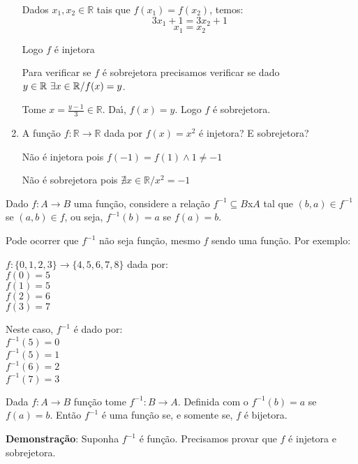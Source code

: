 \begin{exemplos}
\begin{enumerate}
		Dados $x_{1}, x_{2}\in\mathbb{R}$ tais que $f(x_{1})=f(x_{2})$, temos:
		\[3x_{1}+1=3x_{2}+1\]
		\[x_{1}=x_{2}\]

		Logo $f$ {\'e} injetora

		Para verificar se $f$ {\'e} sobrejetora precisamos verificar se dado $y\in\mathbb{R}\\ \ \exists x\in\mathbb{R}/f(x)=y$.

		Tome $x=\displaystyle\frac{y-1}{3}\in\mathbb{R}$. Da{\'\i}, $f(x)=y$. Logo $f$ {\'e} sobrejetora.
		
		\item A fun{\c c}{\~a}o $f:\mathbb{R}\rightarrow\mathbb{R}$ dada por $f(x)=x^{2}$ {\'e} injetora? E sobrejetora?

		N{\~a}o {\'e} injetora pois $f(-1)=f(1)\wedge 1\neq -1$

		N{\~a}o {\'e} sobrejetora pois $\nexists x\in\mathbb{R}/x^{2}=-1$

		\end{enumerate}
\end{exemplos}


Dado $f:A\rightarrow B$ uma fun{\c c}{\~a}o, considere a rela{\c c}{\~a}o $f^{-1}\subseteq B$x$A$ tal que $(b,a)\in f^{-1}$ se $(a,b)\in f$, ou seja, $f^{-1}(b)=a$ se $f(a)=b$.

Pode ocorrer que $f^{-1}$ n{\~a}o seja fun{\c c}{\~a}o, mesmo $f$ sendo uma fun{\c c}{\~a}o. Por exemplo:

$f:\{0,1,2,3\}\rightarrow\{4,5,6,7,8\}$ dada por:\\
$f(0)=5$\\
$f(1)=5$\\
$f(2)=6$\\
$f(3)=7$

Neste caso, $f^{-1}$ {\'e} dado por:\\
$f^{-1}(5)=0$\\
$f^{-1}(5)=1$\\
$f^{-1}(6)=2$\\
$f^{-1}(7)=3$

\begin{teorema}
Dada $f:A\rightarrow B$ fun{\c c}{\~a}o tome $f^{-1}:B\rightarrow A$. Definida com o $f^{-1}(b)=a$ se $f(a)=b$. Ent{\~a}o $f^{-1}$ {\'e} uma fun{\c c}{\~a}o se, e somente se, $f$ {\'e} bijetora.
\end{teorema}

\textbf{Demonstra{\c c}{\~a}o}: Suponha $f^{-1}$ {\'e} fun{\c c}{\~a}o. Precisamos provar que $f$ {\'e} injetora e sobrejetora.


